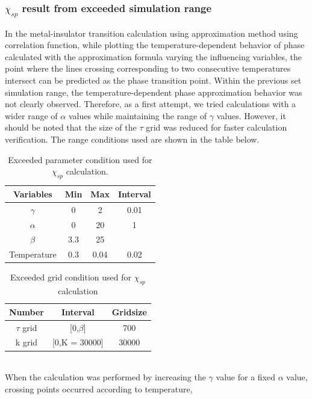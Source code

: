 \documentclass{article}[12pt]
\begin{document}
\begin{spacing}{1.5}
\subsubsection*{$\chi_{sp}$ result from exceeded simulation range}
In the metal-insulator transition calculation using approximation method using correlation function, 
while plotting the temperature-dependent behavior of phase calculated with the approximation formula varying the influencing variables, 
the point where the lines crossing corresponding to two consecutive temperatures intersect can be predicted as the phase transition point.
Within the previous set simulation range, 
the temperature-dependent phase approximation behavior was not clearly observed. 
Therefore, as a first attempt, we tried calculations with a wider range of $\alpha$ values while maintaining the range of $\gamma$ values. 
However, it should be noted that the size of the $\tau$ grid was reduced for faster calculation verification. 
The range conditions used are shown in the table below.
\begin{table}[htbp]
  \centering
  \renewcommand{\arraystretch}{1.2}  %
  \begin{tabular}{@{}cccc@{}}
  \toprule
  \textbf{Variables} & \textbf{Min} & \textbf{Max}  & \textbf{Interval}\\ 
  \midrule
  $\gamma$ & 0 & 2 & 0.01 \\
  $\alpha$ & 0 & 20 & 1 \\
  $\beta$ & 3.3 & 25 &  \\
  Temperature & 0.3 & 0.04 & 0.02 \\
  \bottomrule
  \end{tabular}
  \caption{Exceeded parameter condition used for $\chi_{sp}$ calculation.}
  \end{table}
\begin{table}[htbp]
  \centering
  \renewcommand{\arraystretch}{1.2}  %
  \begin{tabular}{@{}ccc@{}}
  \toprule
  \textbf{Number} & \textbf{Interval} & \textbf{Gridsize}\\ 
  \midrule
  $\tau$ grid & [0,$\beta$] & 700 \\
  k grid & [0,K = 30000] & 30000 \\
  \bottomrule
  \end{tabular}
  \caption{Exceeded grid condition used for $\chi_{sp}$ calculation}
  \end{table}
\\
When the calculation was performed by increasing the $\gamma$ value for a fixed $\alpha$ value, crossing points occurred according to temperature, 

\end{spacing}
\end{document}
